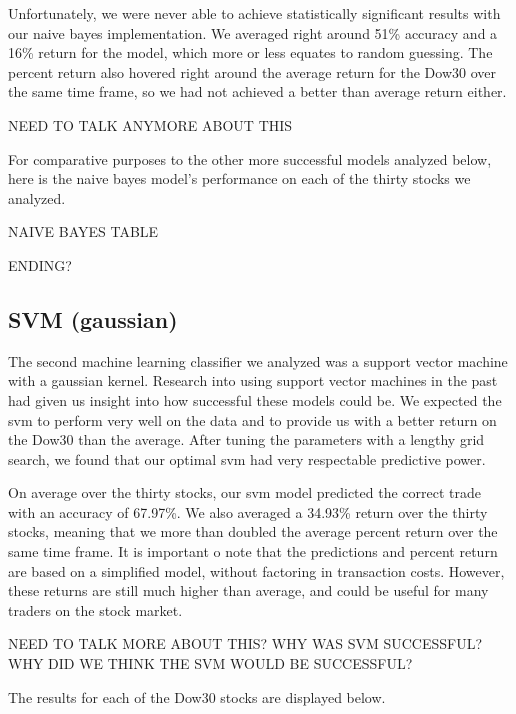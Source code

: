 \documentclass{article}
\begin{document}
Unfortunately, we were never able to achieve statistically significant results with our naive bayes implementation. We averaged right around 51\% accuracy and a 16\% return for the model, which more or less equates to random guessing. The percent return also hovered right around the average return for the Dow30 over the same time frame, so we had not achieved a better than average return either.

NEED TO TALK ANYMORE ABOUT THIS

For comparative purposes to the other more successful models analyzed below, here is the naive bayes model's performance on each of the thirty stocks we analyzed.

NAIVE BAYES TABLE

ENDING?

\subsection{SVM (gaussian)}
The second machine learning classifier we analyzed was a support vector machine with a gaussian kernel. Research into using support vector machines in the past had given us insight into how successful these models could be. We expected the svm to perform very well on the data and to provide us with a better return on the Dow30 than the average. After tuning the parameters with a lengthy grid search, we found that our optimal svm had very respectable predictive power.

On average over the thirty stocks, our svm model predicted the correct trade with an accuracy of 67.97\%. We also averaged a 34.93\% return over the thirty stocks, meaning that we more than doubled the average percent return over the same time frame. It is important o note that the predictions and percent return are based on a simplified model, without factoring in transaction costs. However, these returns are still much higher than average, and could be useful for many traders on the stock market.

NEED TO TALK MORE ABOUT THIS? WHY WAS SVM SUCCESSFUL? WHY DID WE THINK THE SVM WOULD BE SUCCESSFUL?

The results for each of the Dow30 stocks are displayed below.
\end{document}
